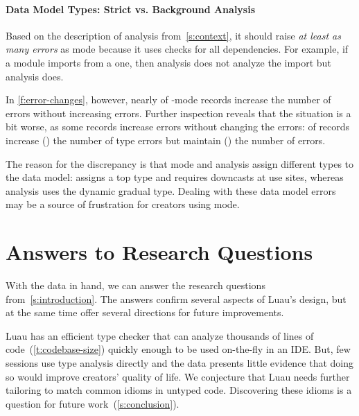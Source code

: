 \documentclass[english,submission,cleveref]{programming}
\begin{document}
\paragraph{Data Model Types: Strict vs. Background Analysis}

Based on the description of \FS{} analysis from~\cref{s:context},
it should raise \emph{at least as many errors} as \mstrict{} mode
because it uses \mstrict{} checks for all dependencies.
For example, if a \mstrict{} module imports from a \mnocheck{} one,
then \mstrict{} analysis does not analyze the import but
\FS{} analysis does.

In \cref{f:error-changes}, however, nearly  of \mstrict{}-mode records
increase the number of \mstrict{} errors without increasing \FS{} errors.
Further inspection reveals that the situation is a bit worse, as
some records increase \mstrict{} errors without changing the \FS{} errors:
     of \mstrict{} records increase (\addsym{}) the number of type errors
    but maintain (\keepsym{}) the number of \FS{} errors.

The reason for the discrepancy is that \mstrict{} mode and \FS{} analysis
assign different types to the data model: \mstrict{} assigns a top type
and requires downcasts at use sites, whereas \FS{} analysis uses the
dynamic gradual type.
Dealing with these data model errors may be a source of frustration
for creators using \mstrict{} mode.


\section{Answers to Research Questions}
\label{s:discussion}

With the data in hand, we can answer the research questions
from~\cref{s:introduction}.
The answers confirm several aspects of Luau's design, but
at the same time offer several directions for future improvements.

Luau has an efficient type checker that can
analyze thousands of lines of code~(\cref{t:codebase-size}) quickly
enough to be used on-the-fly in an IDE.
But, few sessions use type analysis directly and the data presents little
evidence that doing so would improve creators' quality of life.
We conjecture that Luau needs further tailoring to match
common idioms in untyped code.
Discovering these idioms is a question for future work~(\cref{s:conclusion}).
\end{document}
